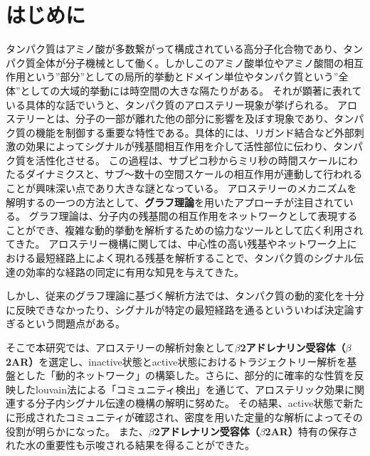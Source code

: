 \section{はじめに}

タンパク質はアミノ酸が多数繋がって構成されている高分子化合物であり、タンパク質全体が分子機械として働く。しかしこのアミノ酸単位やアミノ酸間の相互作用という”部分”としての局所的挙動とドメイン単位やタンパク質という”全体”としての大域的挙動には時空間の大きな隔たりがある。
それが顕著に表れている具体的な話でいうと、タンパク質のアロステリー現象が挙げられる。
アロステリーとは、分子の一部が離れた他の部分に影響を及ぼす現象であり、タンパク質の機能を制御する重要な特性である。具体的には、リガンド結合など外部刺激の効果によってシグナルが残基間相互作用を介して活性部位に伝わり、タンパク質を活性化させる。
この過程は、サブピコ秒からミリ秒の時間スケールにわたるダイナミクスと、サブ\text{\AA}～数十\text{\AA}の空間スケールの相互作用が連動して行われることが興味深い点であり大きな謎となっている。
アロステリーのメカニズムを解明するの一つの方法として、\textbf{グラフ理論}を用いたアプローチが注目されている。
グラフ理論は、分子内の残基間の相互作用をネットワークとして表現することができ、複雑な動的挙動を解析するための協力なツールとして広く利用されてきた。
アロステリー機構に関しては、中心性の高い残基やネットワーク上における最短経路上によく現れる残基を解析することで、タンパク質のシグナル伝達の効率的な経路の同定に有用な知見を与えてきた。

しかし、従来のグラフ理論に基づく解析方法では、タンパク質の動的変化を十分に反映できなかったり、シグナルが特定の最短経路を通るといういわば決定論すぎるという問題点がある。

そこで本研究では、アロステリーの解析対象として\textbf{$\beta$2アドレナリン受容体（$\beta$2AR）}を選定し、inactive状態とactive状態におけるトラジェクトリー解析を基盤とした「動的ネットワーク」の構築した。さらに、部分的に確率的な性質を反映したlouvain法による「コミュニティ検出」を通じて、アロステリック効果に関連する分子内シグナル伝達の機構の解明に努めた。
その結果、active状態で新たに形成されたコミュニティが確認され、密度を用いた定量的な解析によってその役割が明らかになった。
また、\textbf{$\beta$2アドレナリン受容体（$\beta$2AR）}特有の保存された水の重要性も示唆される結果を得ることができた。


